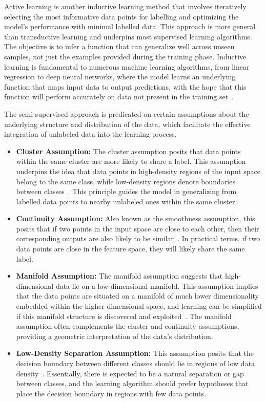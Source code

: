 Active learning is another inductive learning method that involves iteratively selecting the most informative data points for labelling and optimizing the model's performance with minimal labelled data.
This approach is more general than transductive learning and underpins most supervised learning algorithms.
The objective is to infer a function that can generalize well across unseen samples, not just the examples provided during the training phase.
Inductive learning is fundamental to numerous machine learning algorithms, from linear regression to deep neural networks, where the model learns an underlying function that maps input data to output predictions, with the hope that this function will perform accurately on data not present in the training set~\cite{mitchell1997machine}.

The semi-supervised approach is predicated on certain assumptions about the underlying structure and distribution of the data, which facilitate the effective integration of unlabeled data into the learning process.
\begin{itemize}
	\item \textbf{Cluster Assumption:} {The cluster assumption posits that data points within the same cluster are more likely to share a label. This assumption underpins the idea that data points in high-density regions of the input space belong to the same class, while low-density regions denote boundaries between classes~\cite{chapelle2009semi}. This principle guides the model in generalizing from labelled data points to nearby unlabeled ones within the same cluster.}
	\item \textbf{Continuity Assumption:} {Also known as the smoothness assumption, this posits that if two points in the input space are close to each other, then their corresponding outputs are also likely to be similar~\cite{zhou2004learning}. In practical terms, if two data points are close in the feature space, they will likely share the same label.}
	\item \textbf{Manifold Assumption:} {The manifold assumption suggests that high-dimensional data lie on a low-dimensional manifold. This assumption implies that the data points are situated on a manifold of much lower dimensionality embedded within the higher-dimensional space, and learning can be simplified if this manifold structure is discovered and exploited~\cite{belkin2006manifold}. The manifold assumption often complements the cluster and continuity assumptions, providing a geometric interpretation of the data's distribution.}
	\item \textbf{Low-Density Separation Assumption:} {This assumption posits that the decision boundary between different classes should lie in regions of low data density~\cite{chapelle2009semi}. Essentially, there is expected to be a natural separation or gap between classes, and the learning algorithm should prefer hypotheses that place the decision boundary in regions with few data points.}
\end{itemize}

